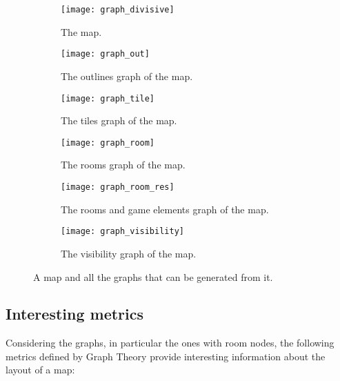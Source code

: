 \begin{figure}[]
	\centering
	\hfill
  	\begin{subfigure}[t]{0.45\linewidth}
		\texttt{[image: graph\_divisive]}
     		\caption{The map.}
     		\label{img:graph_divisive}
 	\end{subfigure}
 	\hfill
  	\begin{subfigure}[t]{0.45\linewidth}
    		\texttt{[image: graph\_out]}
    		\caption{The outlines graph of the map.}
     		\label{img:graph_out}
  	\end{subfigure}
  	\hfill
  	
  	\hfill
  	\begin{subfigure}[t]{0.45\linewidth}
    		\texttt{[image: graph\_tile]}
    		\caption{The tiles graph of the map.}
     		\label{img:graph_tile}
  	\end{subfigure}
  	\hfill
  	\begin{subfigure}[t]{0.45\linewidth}
    		\texttt{[image: graph\_room]}
    		\caption{The rooms graph of the map.}
     		\label{img:graph_room}
 	\end{subfigure}
 	\hfill
 	
 	\hfill
  	\begin{subfigure}[t]{0.45\linewidth}
    		\texttt{[image: graph\_room\_res]}
    		\caption{The rooms and game elements graph of the map.}
     		\label{img:graph_room_res}
  	\end{subfigure}
  	\hfill
  	\begin{subfigure}[t]{0.45\linewidth}
    		\texttt{[image: graph\_visibility]}
    		\caption{The visibility graph of the map.}
     		\label{img:graph_visibility}
  	\end{subfigure}	
  	\hfill
	\caption{A map and all the graphs that can be generated from it.}
\end{figure}

\subsection{Interesting metrics}
\label{ss:interesting_metrics}

Considering the graphs, in particular the ones with room nodes, the following metrics defined by Graph Theory provide interesting information about the layout of a map:

